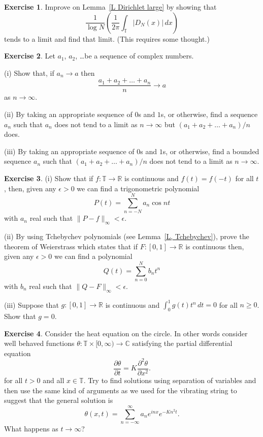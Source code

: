 \documentclass[12pt]{article}
\theoremstyle{definition}
\newtheorem{question}{Exercise}[section]
\begin{document}
\begin{question} Improve on Lemma~\ref{L Dirichlet large}
by showing that
\[\frac{1}{\log N}\left(\frac{1}{2\pi}
\int_{\mathbb T}|D_{N}(x)|\,dx\right)\]
tends to a limit and find that limit. (This requires some thought.)
\end{question}
\begin{question} Let $a_{1}$, $a_{2}$, \dots be a sequence
of complex numbers.

(i) Show that, if $a_{n}\rightarrow a$ then
\[\frac{a_{1}+a_{2}+\dots+a_{n}}{n}\rightarrow a\]
as $n\rightarrow\infty$.

(ii) By taking an appropriate sequence of $0$s and $1$s,
or otherwise, find a sequence $a_{n}$ such that
$a_{n}$ does not tend to a limit as $n\rightarrow\infty$
but $(a_{1}+a_{2}+\dots+a_{n})/n$ does.

(iii) By taking an appropriate sequence of $0$s and $1$s,
or otherwise, find a bounded sequence $a_{n}$ such that
$(a_{1}+a_{2}+\dots+a_{n})/n$ does not tend to a limit
as $n\rightarrow\infty$.
\end{question}
\begin{question} (i) Show that if $f:{\mathbb T}\rightarrow{\mathbb R}$ 
is continuous and $f(t)=f(-t)$ for all $t$,
then, given any $\epsilon>0$ we can find a 
trigonometric polynomial 
\[P(t)=\sum_{n=-N}^{N}a_{n}\cos nt\]
with $a_{n}$ real such that $\|P-f\|_{\infty}<\epsilon$.

(ii) By using Tchebychev polynomials 
(see Lemma~\ref{L, Tchebychev}),
prove the theorem of Weierstrass which states that if
$F:[0,1]\rightarrow{\mathbb R}$ is continuous 
then, given any $\epsilon>0$ we can find a 
polynomial 
\[Q(t)=\sum_{n=0}^{N}b_{n}t^{n}\]
with $b_{n}$ real such that $\|Q-F\|_{\infty}<\epsilon$.

(iii) Suppose that $g:[0,1]\rightarrow{\mathbb R}$ is continuous
and $\int_{0}^{1}g(t)t^{n}\,dt=0$ for all $n\geq 0$.
Show that $g=0$.
\end{question}
\begin{question} Consider the heat equation on the circle.
In other words consider well behaved functions
$\theta:{\mathbb T}\times[0,\infty)\rightarrow{\mathbb C}$
satisfying the partial differential equation
\[
\frac{\partial\theta}{\partial t}
=K\frac{\partial^{2} \theta}{\partial x^{2}}.
\]
for all $t>0$ and all $x\in{\mathbb T}$.
Try to find solutions using separation of variables and
then use the same kind of arguments as we used for the
vibrating string to suggest that the general solution
is
\[\theta(x,t)=\sum_{n=-\infty}^{\infty}a_{n}e^{inx}e^{-Kn^{2}t}.\]
What happens as $t\rightarrow \infty$?
\end{question}
\end{document}
